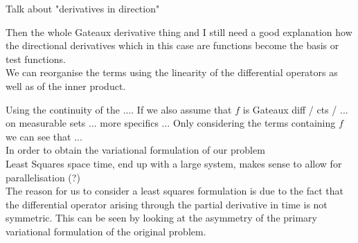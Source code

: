 \documentclass[../draft_1.tex]{subfiles}
\begin{document}
Talk about "derivatives in direction" 

Then the whole Gateaux derivative thing and I still need a good explanation how the directional derivatives which in this case are functions become the basis or test functions. 
\smallskip
\\
We can reorganise the terms using the linearity of the differential operators as well as of the inner product. 

Using the continuity of the .... If we also assume that $f$ is Gateaux diff / cts / ... on measurable sets ... more specifics ... 
Only considering the terms containing $f$ we can see that ... 
\\ 
In order to obtain the variational formulation of our problem 
\\
Least Squares space time, end up with a large system, makes sense to allow for parallelisation (?) \\



The reason for us to consider a least squares formulation is due to the fact that the differential operator arising through the partial derivative in time is not symmetric. This can be seen by looking at the asymmetry of the primary variational formulation of the original problem. 
\end{document}
